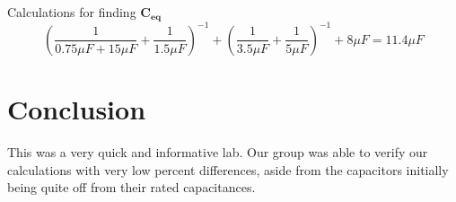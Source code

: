 \documentclass[titlepage]{article}
\begin{document}
    {{Calculations for finding $\mathbf{C_{eq}}$}}
        $$\left( \frac{1}{0.75\mu F+15\mu F}+\frac{1}{1.5\mu F} \right)^{-1}+\left(\frac{1}{3.5\mu F}+\frac{1}{5\mu F}\right)^{-1}+8\mu F  = 11.4 \mu F$$


    
    
  	\section{Conclusion}
    This was a very quick and informative lab. Our group was able to verify our calculations with very low percent differences, aside from the capacitors initially being quite off from their rated capacitances. 
\end{document}
